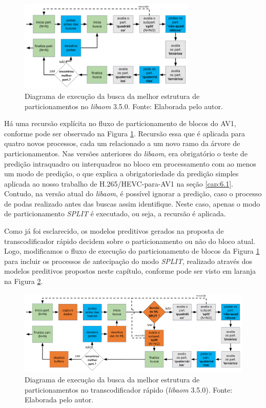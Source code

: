 \begin{figure}
    \centering
    \includegraphics[width=0.75\textwidth]{FIGURES/fig_30.png}
    \caption{Diagrama de execução da busca da melhor estrutura de particionamentos no \textit{libaom} 3.5.0. Fonte: Elaborada pelo autor.}
    \label{fig:30}
\end{figure}

Há uma recursão explícita no fluxo de particionamento de blocos do AV1, conforme pode ser observado na Figura \ref{fig:30}. Recursão essa que é aplicada para quatro novos processos, cada um relacionado a um novo ramo da árvore de particionamentos. Nas versões anteriores do \textit{libaom}, era obrigatório o teste de predição intraquadro ou interquadros no bloco em processamento com ao menos um modo de predição, o que explica a obrigatoriedade da predição simples aplicada ao nosso trabalho de H.265/HEVC-para-AV1 na seção \ref{cap:6.1}. Contudo, na versão atual do \textit{libaom}, é possível ignorar a predição, caso o processo de podas realizado antes das buscas assim identifique. Neste caso, apenas o modo de particionamento \textit{SPLIT} é executado, ou seja, a recursão é aplicada.

Como já foi esclarecido, os modelos preditivos gerados na proposta de transcodificador rápido decidem sobre o particionamento ou não do bloco atual. Logo, modificamos o fluxo de execução do particionamento de blocos da Figura \ref{fig:30} para incluir os processos de antecipação do modo \textit{SPLIT}, realizado através dos modelos preditivos propostos neste capítulo, conforme pode ser visto em laranja na Figura \ref{fig:31}.

\begin{figure}
    \centering
    \includegraphics[width=\textwidth]{FIGURES/fig_31.png}
    \caption{Diagrama de execução da busca da melhor estrutura de particionamentos no transcodificador rápido (\textit{libaom} 3.5.0). Fonte: Elaborada pelo autor.}
    \label{fig:31}
\end{figure}

